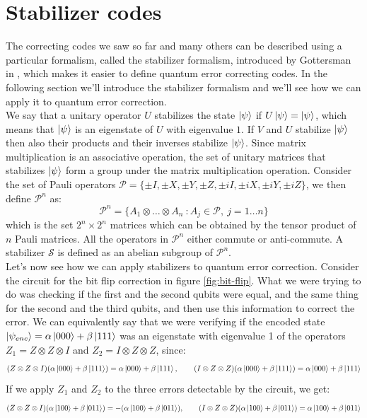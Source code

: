 \documentclass{article}
\begin{document}
	\section{Stabilizer codes}
	The correcting codes we saw so far and many others can be described using a particular formalism, called the stabilizer formalism, introduced by Gottersman in \cite{Gottesman1997StabilizerCA}, which makes it easier to define quantum error correcting codes. In the following section we'll introduce the stabilizer formalism and we'll see how we can apply it to quantum error correction.\\
	We say that a unitary operator $U$ stabilizes the state $\ket{\psi}$ if $U\ket{\psi} = \ket{\psi}$, which means that $\ket{\psi}$ is an eigenstate of $U$ with eigenvalue $1$. If $V$ and $U$ stabilize $\ket{\psi}$ then also their products and their inverses stabilize $\ket{\psi}$. Since matrix multiplication is an associative operation, the set of unitary matrices that stabilizes $\ket{\psi}$ form a group under the matrix multiplication operation. Consider the set of Pauli operators $\mathcal{P} = \{\pm I,\pm X,\pm Y,\pm Z, \pm iI,\pm iX,\pm iY,\pm iZ\}$, we then define $\mathcal{P}^n$ as:
	\[ \mathcal{P}^n = \{A_1\otimes \dots \otimes A_n\ \colon A_j \in \mathcal{P},\ j=1\dots n\} \]
	which is the set $2^n\times2^n$ matrices which can be obtained by the tensor product of $n$ Pauli matrices. All the operators in $\mathcal{P}^n$ either commute or anti-commute. A stabilizer $\mathcal{S}$ is defined as an abelian subgroup of $\mathcal{P}^n$.\\
	Let's now see how we can apply stabilizers to quantum error correction. Consider the circuit for the bit flip correction in figure \ref{fig:bit-flip}. What we were trying to do was checking if the first and the second qubits were equal, and the same thing for the second and the third qubits, and then use this information to correct the error. We can equivalently say that we were verifying if the encoded state $\ket{\psi_{enc}} = \alpha\ket{000} + \beta\ket{111}$ was an eigenstate with eigenvalue 1 of the operators $Z_1 = Z\otimes Z \otimes I$ and $Z_2 = I \otimes Z \otimes Z$, since:
	\[(Z\otimes Z \otimes I)(\alpha\ket{000} + \beta\ket{111}) = \alpha\ket{000} + \beta\ket{111},\qquad (I\otimes Z \otimes Z)(\alpha\ket{000} + \beta\ket{111}) = \alpha\ket{000} + \beta\ket{111}\]
	If we apply $Z_1$ and $Z_2$  to the three errors detectable by the circuit, we get:
	\[(Z\otimes Z \otimes I)(\alpha\ket{100} + \beta\ket{011}) = -(\alpha\ket{100} + \beta\ket{011}),\qquad (I\otimes Z \otimes Z)(\alpha\ket{100} + \beta\ket{011}) = \alpha\ket{100} + \beta\ket{011}\]
\end{document}
